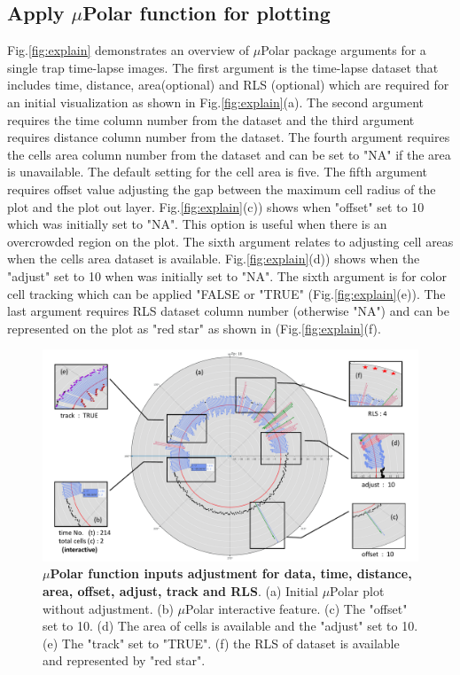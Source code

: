 \documentclass[conference]{IEEEtran}
\begin{document}
\subsection{Apply $\mu$Polar function for plotting}

Fig.\ref{fig:explain} demonstrates an overview of $\mu$Polar package arguments for a single trap time-lapse images. The first argument is the time-lapse dataset that includes time, distance, area(optional) and RLS (optional) which are required for an initial visualization as shown in  Fig.\ref{fig:explain}(a). The second argument requires the time column number from the dataset and the third argument requires distance column number from the dataset. The fourth argument requires the cells area column number from the dataset and can be set to "NA" if the area is unavailable. The default setting for the cell area is five. The fifth argument requires offset value adjusting the gap between the maximum cell radius of the plot and the plot out layer. Fig.\ref{fig:explain}(c)) shows when "offset" set to 10 which was initially set to "NA". This option is useful when there is an overcrowded region on the plot. The sixth argument relates to adjusting cell areas when the cells area dataset is available. Fig.\ref{fig:explain}(d)) shows when the "adjust" set to 10 when was initially set to "NA". The sixth argument is for color cell tracking which can be applied "FALSE or "TRUE" (Fig.\ref{fig:explain}(e)). The last argument requires RLS dataset column number (otherwise "NA") and can be represented on the plot as "red star" as shown in (Fig.\ref{fig:explain}(f).


\begin{figure}
\centering
\includegraphics[width=\textwidth,height=10 cm]{Patterns/option.pdf}
\caption{ \textbf{ $\mu$Polar function inputs adjustment for data, time, distance, area, offset, adjust, track and RLS}. (a) Initial $\mu$Polar plot without adjustment. (b) $\mu$Polar interactive feature. (c) The "offset" set to 10. (d) The area of cells is available and the "adjust" set to 10. (e) The "track" set to "TRUE". (f) the RLS of dataset is available and represented by "red star".}
\label{fig:areaoff}
\end{figure}
\end{document}
